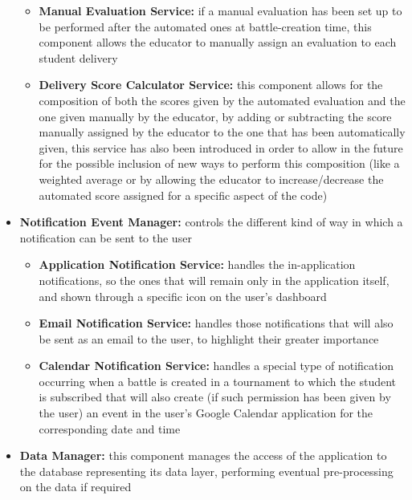 \documentclass[../DD.tex]{subfiles}
\begin{document}
\begin{itemize}
\begin{itemize}
            \item \textbf{Manual Evaluation Service:} if a manual evaluation has been set up to be performed after the automated ones at battle-creation time, this component allows the educator to manually assign an evaluation to each student delivery
            \item \textbf{Delivery Score Calculator Service:} this component allows for the composition of both the scores given by the automated evaluation and the one given manually by the educator, by adding or subtracting the score manually assigned by the educator to the one that has been automatically given, this service has also been introduced in order to allow in the future for the possible inclusion of new ways to perform this composition (like a weighted average or by allowing the educator to increase/decrease the automated score assigned for a specific aspect of the code)
        \end{itemize}
        \item \textbf{Notification Event Manager:} controls the different kind of way in which a notification can be sent to the user
        \begin{itemize}
            \item \textbf{Application Notification Service:} handles the in-application notifications, so the ones that will remain only in the application itself, and shown through a specific icon on the user's dashboard
            \item \textbf{Email Notification Service:} handles those notifications that will also be sent as an email to the user, to highlight their greater importance
            \item \textbf{Calendar Notification Service:} handles a special type of notification occurring when a battle is created in a tournament to which the student is subscribed that will also create (if such permission has been given by the user) an event in the user's Google Calendar application for the corresponding date and time
        \end{itemize}
        \item \textbf{Data Manager:} this component manages the access of the application to the database representing its data layer, performing eventual pre-processing on the data if required
    \end{itemize}
    \newpage
\end{document}
